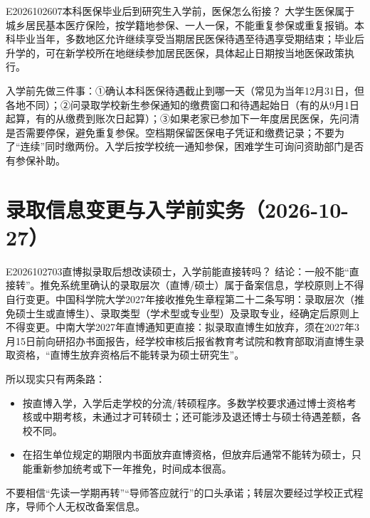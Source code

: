 \begin{qa}{E2026102607}{本科医保毕业后到研究生入学前，医保怎么衔接？}
大学生医保属于城乡居民基本医疗保险，按学籍地参保、一人一保，不能重复参保或重复报销。本科毕业当年，多数地区允许继续享受当期居民医保待遇至待遇享受期结束；毕业后升学的，可在新学校所在地继续参加居民医保，具体起止日期按当地医保政策执行。

入学前先做三件事：①确认本科医保待遇截止到哪一天（常见为当年12月31日，但各地不同）；②问录取学校新生参保通知的缴费窗口和待遇起始日（有的从9月1日起算，有的从缴费到账次日起算）；③如果老家已参加下一年度居民医保，先问清是否需要停保，避免重复参保。空档期保留医保电子凭证和缴费记录；不要为了“连续”同时缴两份。入学后按学校统一通知参保，困难学生可询问资助部门是否有参保补助。
\end{qa}

\section{录取信息变更与入学前实务（2026-10-27）}
\begin{qa}{E2026102703}{直博拟录取后想改读硕士，入学前能直接转吗？}
结论：一般不能“直接转”。推免系统里确认的录取层次（直博/硕士）属于备案信息，学校原则上不得自行变更。中国科学院大学2027年接收推免生章程第二十二条写明：录取层次（推免硕士生或直博生）、录取类型（学术型或专业型）及录取专业，经确定后原则上不得变更。中南大学2027年直博通知更直接：拟录取直博生如放弃，须在2027年3月15日前向研招办书面报告，经学校审核后报省教育考试院和教育部取消直博生录取资格，“直博生放弃资格后不能转录为硕士研究生”。

所以现实只有两条路：
\begin{itemize}
  \item 按直博入学，入学后走学校的分流/转硕程序。多数学校要求通过博士资格考核或中期考核，未通过才可转硕士；还可能涉及退还博士与硕士待遇差额，各校不同。
  \item 在招生单位规定的期限内书面放弃直博资格，但放弃后通常不能转为硕士，只能重新参加统考或下一年推免，时间成本很高。
\end{itemize}

不要相信“先读一学期再转”“导师答应就行”的口头承诺；转层次要经过学校正式程序，导师个人无权改备案信息。
\end{qa}


